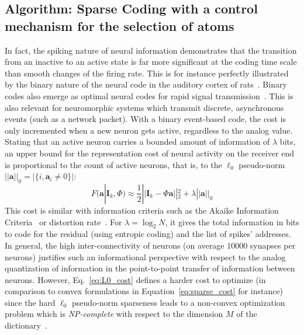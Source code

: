 \documentclass[a4paper, 11pt, draft]{article} %
\newcommand{\coef}{\mathbf{a}} %
\newcommand{\image}{\mathbf{I}} %
\newcommand{\dico}{\Phi} %
\newcommand{\enscond}[2]{\lbrace #1, #2 \rbrace}
\newcommand{\norm}[1]{|\!| #1 |\!|}
\newcommand{\abs}[1]{\left|#1\right|}
\newcommand{\seeEq}[1]{Eq.~\ref{eq:#1}}%
\begin{document}
\subsection{Algorithm: Sparse Coding with a control mechanism for the selection of atoms}
In fact, the spiking nature of neural information demonstrates that the transition from an inactive to an active state is far more significant at the coding time scale than smooth changes of the firing rate. 
This is for instance perfectly illustrated by the binary nature of the neural code in the auditory cortex of rats~\citep{DeWeese03}. Binary codes also emerge as optimal neural codes for rapid signal transmission~\citep{Bethge03}. This is also relevant for neuromorphic systems which transmit discrete, asynchronous events (such as a network packet). With a binary event-based code, the cost is only incremented when a new neuron gets active, regardless to the analog value. Stating that an active neuron carries a bounded amount of information of $\lambda$ bits, an upper bound for the representation cost of neural activity on the receiver end is proportional to the count of active neurons, that is, to the $\ell_0$ pseudo-norm $\norm{\coef}_0 = \abs{\enscond{i}{\coef_i \neq 0}}$:%
\begin{equation}%
F( \coef | \image_k , \dico) \approx  \frac{1}{2} \norm{\image_k - \dico \coef}_2^2 + \lambda\norm{\coef}_0%
\label{eq:L0_cost}%
\end{equation}%
This cost is similar with information criteria such as the Akaike Information Criteria~\citep{Akaike74} or distortion rate~\citep[p.~571]{Mallat98}. For $\lambda=\log_2 N$, it gives the total information in bits to code for the residual (using entropic coding) and the list of spikes' addresses. In general, the high inter-connectivity of neurons (on average $10000$ synapses per neurons) justifies such an informational perspective with respect to the analog quantization of information in the point-to-point transfer of information between neurons. 
However, \seeEq{L0_cost} defines a harder cost to optimize (in comparison to convex formulations in Equation~\ref{eq:sparse_cost} for instance) since the hard $\ell_0$ pseudo-norm sparseness leads to a non-convex optimization problem which is \emph{NP-complete} with respect to the dimension $M$ of the dictionary~\citep[p.~418]{Mallat98}.
\end{document}
